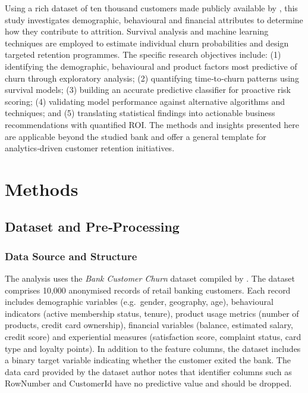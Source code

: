 \documentclass[12pt]{article}
\begin{document}
Using a rich dataset of ten thousand customers made publicly available by \citet{kollipara2022bank}, this study investigates demographic, behavioural and financial attributes to determine how they contribute to attrition.  Survival analysis and machine learning techniques are employed to estimate individual churn probabilities and design targeted retention programmes.  The specific research objectives include: (1) identifying the demographic, behavioural and product factors most predictive of churn through exploratory analysis; (2) quantifying time‑to‑churn patterns using survival models; (3) building an accurate predictive classifier for proactive risk scoring; (4) validating model performance against alternative algorithms and techniques; and (5) translating statistical findings into actionable business recommendations with quantified ROI.  The methods and insights presented here are applicable beyond the studied bank and offer a general template for analytics‑driven customer retention initiatives.

\section{Methods}
\subsection{Dataset and Pre‑Processing}
\subsubsection{Data Source and Structure}
The analysis uses the \emph{Bank Customer Churn} dataset compiled by \citet{kollipara2022bank}.  The dataset comprises 10,000 anonymised records of retail banking customers.  Each record includes demographic variables (e.g.\ gender, geography, age), behavioural indicators (active membership status, tenure), product usage metrics (number of products, credit card ownership), financial variables (balance, estimated salary, credit score) and experiential measures (satisfaction score, complaint status, card type and loyalty points).  In addition to the feature columns, the dataset includes a binary target variable indicating whether the customer exited the bank.  The data card provided by the dataset author notes that identifier columns such as RowNumber and CustomerId have no predictive value and should be dropped.
\end{document}
